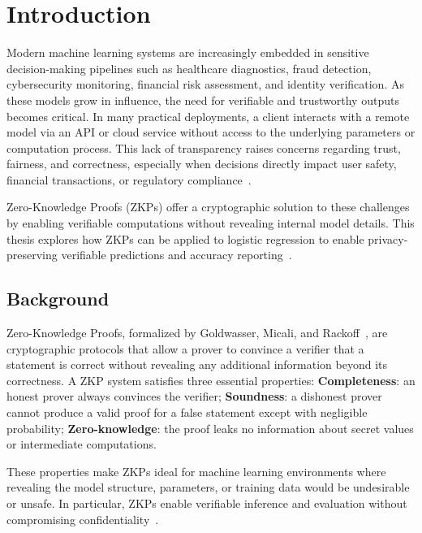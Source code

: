 \chapter{Introduction}

Modern machine learning systems are increasingly embedded in sensitive decision-making pipelines such as healthcare diagnostics, fraud detection, cybersecurity monitoring, financial risk assessment, and identity verification. As these models grow in influence, the need for verifiable and trustworthy outputs becomes critical. In many practical deployments, a client interacts with a remote model via an API or cloud service without access to the underlying parameters or computation process. This lack of transparency raises concerns regarding trust, fairness, and correctness, especially when decisions directly impact user safety, financial transactions, or regulatory compliance~\cite{lavin2024surveyapplicationszeroknowledgeproofs}.

Zero-Knowledge Proofs (ZKPs) offer a cryptographic solution to these challenges by enabling verifiable computations without revealing internal model details. This thesis explores how ZKPs can be applied to logistic regression to enable privacy-preserving verifiable predictions and accuracy reporting~\cite{cryptoeprint:2025/507}.

\section{Background}

Zero-Knowledge Proofs, formalized by Goldwasser, Micali, and Rackoff~\cite{goldwasser1989knowledge}, are cryptographic protocols that allow a prover to convince a verifier that a statement is correct without revealing any additional information beyond its correctness. A ZKP system satisfies three essential properties:\newline
\textbf{Completeness}: an honest prover always convinces the verifier;  
\newline \textbf{Soundness}: a dishonest prover cannot produce a valid proof for a false statement except with negligible probability;  
\newline \textbf{Zero-knowledge}: the proof leaks no information about secret values or intermediate computations.

These properties make ZKPs ideal for machine learning environments where revealing the model structure, parameters, or training data would be undesirable or unsafe. In particular, ZKPs enable verifiable inference and evaluation without compromising confidentiality~\cite{cryptoeprint:2023/1345}.

